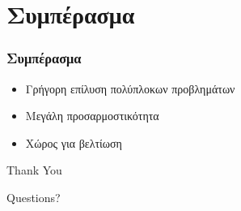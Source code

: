 \documentclass[xetex,mathserif,serif,14pt]{beamer}
\begin{document}
\section{Συμπέρασμα}

\begin{frame}
\frametitle{Συμπέρασμα}
\begin{itemize}
  \item Γρήγορη επίλυση πολύπλοκων προβλημάτων\pause
  \item Μεγάλη προσαρμοστικότητα\pause
  \item Χώρος για βελτίωση
\end{itemize}
\end{frame}


\begin{frame}

\Huge{\centerline{Thank You}}
\Large{\centerline{Questions?}}
\end{frame}

\end{document}
